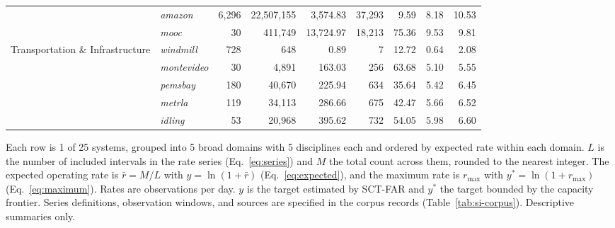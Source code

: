 \documentclass{article}
\begin{document}
\begin{table}[H]
\begin{tabularx}{\linewidth}{@{}Xlrrrrrrr@{}}
 & \textit{amazon} & 6{,}296 & 22{,}507{,}155 & 3{,}574.83 & 37{,}293 & 9.59 & 8.18 & 10.53 \\
 & \textit{mooc} & 30 & 411{,}749 & 13{,}724.97 & 18{,}213 & 75.36 & 9.53 & 9.81 \\
\addlinespace
Transportation \& Infrastructure & \textit{windmill} & 728 & 648 & 0.89 & 7 & 12.72 & 0.64 & 2.08 \\
 & \textit{montevideo} & 30 & 4{,}891 & 163.03 & 256 & 63.68 & 5.10 & 5.55 \\
 & \textit{pemsbay} & 180 & 40{,}670 & 225.94 & 634 & 35.64 & 5.42 & 6.45 \\
 & \textit{metrla} & 119 & 34{,}113 & 286.66 & 675 & 42.47 & 5.66 & 6.52 \\
 & \textit{idling} & 53 & 20{,}968 & 395.62 & 732 & 54.05 & 5.98 & 6.60 \\
\bottomrule
\end{tabularx}
\par\vspace{12pt}
\begin{minipage}{\linewidth}
\footnotesize
Each row is 1 of 25 systems, grouped into 5 broad domains with 5 disciplines each and ordered by expected rate within each domain. $L$ is the number of included intervals in the rate series (Eq.~\eqref{eq:series}) and $M$ the total count across them, rounded to the nearest integer. The expected operating rate is $\bar{r} = M/L$ with $y = \ln(1 + \bar{r})$ (Eq.~\eqref{eq:expected}), and the maximum rate is $r_{\max}$ with $y^{*} = \ln(1 + r_{\max})$ (Eq.~\eqref{eq:maximum}). Rates are observations per day. $y$ is the target estimated by SCT-FAR and $y^{*}$ the target bounded by the capacity frontier. Series definitions, observation windows, and sources are specified in the corpus records (Table~\ref{tab:si-corpus}). Descriptive summaries only.
\end{minipage}
\end{table}
\end{document}
